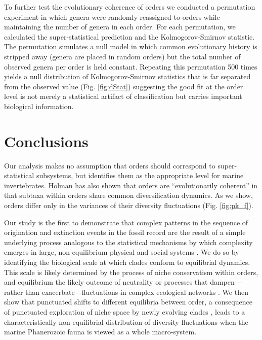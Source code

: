 \documentclass[12pt]{article}
\let\citep=\autocite
\begin{document}
To further test the evolutionary coherence of orders we conducted a
permutation experiment in which genera were randomly reassigned to
orders while maintaining the number of genera in each order. For each
permutation, we calculated the super-statistical prediction and the
Kolmogorov-Smirnov statistic. The permutation simulates a null model
in which common evolutionary history is stripped away (genera are
placed in random orders) but the total number of observed genera per
order is held constant.  Repeating this permutation 500 times yields a
null distribution of Kolmogorov-Smirnov statistics that is far
separated from the observed value (Fig. \ref{fig:dStat}) suggesting
the good fit at the order level is not merely a statistical artifact
of classification but carries important biological information.

\section{Conclusions}

Our analysis makes no assumption that orders should correspond to
super-statistical subsystems, but identifies them as the appropriate
level for marine invertebrates. Holman \citep{holman1989} has also
shown that orders are ``evolutionarily coherent'' in that subtaxa
within orders share common diversification dynamics. As we show,
orders differ only in the variances of their diversity fluctuations
(Fig. \ref{fig:pk_f}).

Our study is the first to demonstrate that complex patterns in the
sequence of origination and extinction events in the fossil record are
the result of a simple underlying process analogous to the statistical
mechanisms by which complexity emerges in large, non-equilibrium
physical \citep{beck2004} and social systems \citep{fuentes2009}.  We
do so by identifying the biological scale at which clades conform to
equilibrial dynamics. This scale is likely determined by the process
of niche conservatism \citep{} within orders, and equilibrium the
likely outcome of neutrality or processes that dampen---rather than
exacerbate---fluctuations in complex ecological networks \citep{}. We
then show that punctuated shifts to different equilibria between
order, a consequence of punctuated exploration of niche space by newly
evolving clades \citep{}, leads to a characteristically
non-equilibrial distribution of diversity fluctuations when the marine
Phanerozoic fauna is viewed as a whole macro-system.
\end{document}

